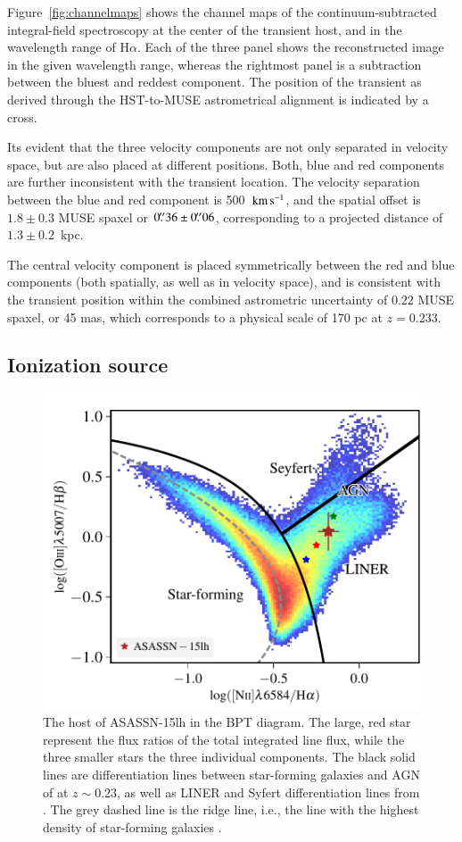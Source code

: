 \documentclass[traditabstract]{aa}
\newcommand{\farc}{\hbox{$.\!\!^{\prime\prime}$}}
\newcommand{\kms}{$\rm{km\,s^{-1}}$}
\newcommand{\ha}{H$\alpha$}
\begin{document}
Figure~\ref{fig:channelmaps} shows the channel maps of the continuum-subtracted integral-field spectroscopy at the center of the transient host, and in the wavelength range of \ha. Each of the three panel shows the reconstructed image in the given wavelength range, whereas the rightmost panel is a subtraction between the bluest and reddest component. The position of the transient as derived through the HST-to-MUSE astrometrical alignment is indicated by a cross.

Its evident that the three velocity components are not only separated in velocity space, but are also placed at different positions. Both, blue and red components are further inconsistent with the transient location. The velocity separation between the blue and red component is 500~\kms, and the spatial offset is $1.8\pm0.3$ MUSE spaxel or $0\farc{36}\pm0\farc{06}$, corresponding to a projected distance of $1.3\pm0.2$~kpc.

The central velocity component is placed symmetrically between the red and blue components (both spatially, as well as in velocity space), and is consistent with the transient position within the combined astrometric uncertainty of $0.22$ MUSE spaxel, or 45 mas, which corresponds to a physical scale of 170 pc at $z=0.233$.

\subsection{Ionization source}
\label{sec:ionsource}

\begin{figure}
  \includegraphics[width=0.999\linewidth]{fig/BPT.pdf}
\caption{The host of ASASSN-15lh in the BPT diagram. The large, red star represent the flux ratios of the total integrated line flux, while the three smaller stars the three individual components. The black solid lines are differentiation lines between star-forming galaxies and AGN of \citet{2013ApJ...774L..10K} at $z\sim0.23$, as well as LINER and Syfert differentiation lines from \citet{2010MNRAS.403.1036C}. The grey dashed line is the ridge line, i.e., the line with the highest density of star-forming galaxies \citep{2008MNRAS.385..769B}.}
\label{fig:BPT}
\end{figure}
\end{document}

